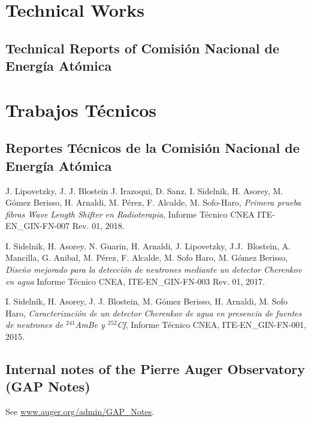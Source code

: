 \ifeng
\section*{Technical Works}
\subsection*{Technical Reports of Comisión Nacional de Energía Atómica}
\else
\section*{Trabajos Técnicos}
\subsection*{Reportes Técnicos de la Comisión Nacional de Energía Atómica}
\fi

\noindent
\begin{etaremune}

\item {} J. Lipovetzky, J. J. Blostein J. Irazoqui, D. Sanz, I. Sidelnik, H. Asorey, M. Gómez Berisso, H. Arnaldi, M. Pérez, F. Alcalde, M. Sofo-Haro, {\textit{Primera prueba fibras Wave Length Shifter en Radioterapia}}, Informe Técnico CNEA ITE-EN\_GIN-FN-007 Rev. 01, 2018.

\item {} I. Sidelnik, H. Asorey, N. Guarin, H. Arnaldi, J. Lipovetzky, J.J.\ Blostein, A. Mancilla, G. Anibal, M. Pérez, F. Alcalde, M. Sofo Haro, M. Gómez Berisso, {\textit{Diseño mejorado para la detección de neutrones mediante un detector Cherenkov en agua}} Informe Técnico CNEA, ITE-EN\_GIN-FN-003 Rev. 01, 2017.

\item {} I. Sidelnik, H. Asorey, J. J. Blostein, M. Gómez Berisso, H. Arnaldi, M. Sofo Haro, {\textit{Caracterización de un detector Cherenkov de agua en presencia de fuentes de neutrones de $^{241}$AmBe y $^{252}$Cf}}, Informe Técnico CNEA, ITE-EN\_GIN-FN-001, 2015.

\end{etaremune}

\ifeng
\subsection*{Internal notes of the Pierre Auger Observatory (GAP Notes)}

See \href{http://www.auger.org/admin-cgi-bin/woda/gap\_notes.pl/Search?search=asorey}{www.auger.org/admin/GAP\_Notes}.
\else
